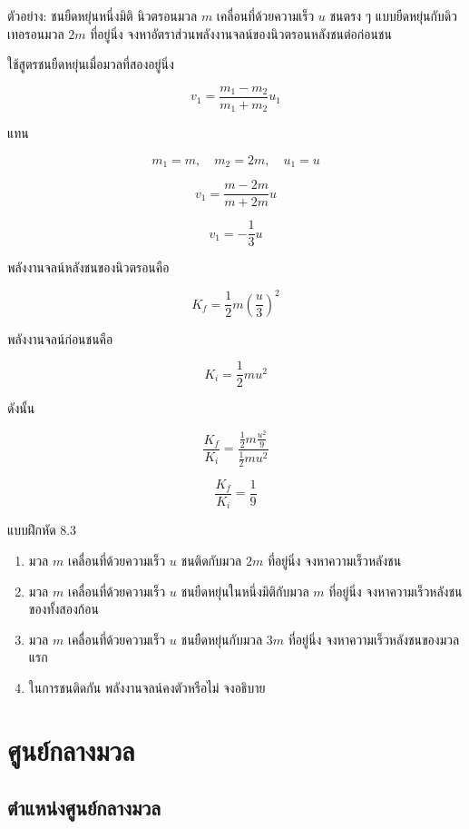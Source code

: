 \begin{examplebox}{ตัวอย่าง: ชนยืดหยุ่นหนึ่งมิติ}
นิวตรอนมวล $m$ เคลื่อนที่ด้วยความเร็ว $u$ ชนตรง ๆ แบบยืดหยุ่นกับดิวเทอรอนมวล $2m$ ที่อยู่นิ่ง จงหาอัตราส่วนพลังงานจลน์ของนิวตรอนหลังชนต่อก่อนชน

ใช้สูตรชนยืดหยุ่นเมื่อมวลที่สองอยู่นิ่ง

\[
v_1=\frac{m_1-m_2}{m_1+m_2}u_1
\]

แทน

\[
m_1=m,\quad m_2=2m,\quad u_1=u
\]

\[
v_1=\frac{m-2m}{m+2m}u
\]

\[
v_1=-\frac{1}{3}u
\]

พลังงานจลน์หลังชนของนิวตรอนคือ

\[
K_f=\frac{1}{2}m\left(\frac{u}{3}\right)^2
\]

พลังงานจลน์ก่อนชนคือ

\[
K_i=\frac{1}{2}mu^2
\]

ดังนั้น

\[
\frac{K_f}{K_i}
=
\frac{\frac{1}{2}m\frac{u^2}{9}}{\frac{1}{2}mu^2}
\]

\[
\boxed{\frac{K_f}{K_i}=\frac{1}{9}}
\]
\end{examplebox}

\begin{exercisebox}{แบบฝึกหัด 8.3}
\begin{enumerate}
    \item มวล $m$ เคลื่อนที่ด้วยความเร็ว $u$ ชนติดกับมวล $2m$ ที่อยู่นิ่ง จงหาความเร็วหลังชน
    \item มวล $m$ เคลื่อนที่ด้วยความเร็ว $u$ ชนยืดหยุ่นในหนึ่งมิติกับมวล $m$ ที่อยู่นิ่ง จงหาความเร็วหลังชนของทั้งสองก้อน
    \item มวล $m$ เคลื่อนที่ด้วยความเร็ว $u$ ชนยืดหยุ่นกับมวล $3m$ ที่อยู่นิ่ง จงหาความเร็วหลังชนของมวลแรก
    \item ในการชนติดกัน พลังงานจลน์คงตัวหรือไม่ จงอธิบาย
\end{enumerate}
\end{exercisebox}

\section{ศูนย์กลางมวล}

\subsection{ตำแหน่งศูนย์กลางมวล}

